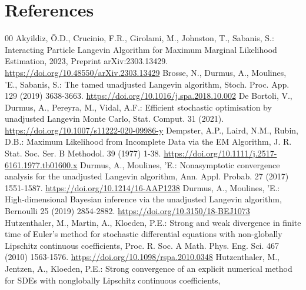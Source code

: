 \documentclass[a4paper, 10pt]{article}
\theoremstyle{plain}%
\begin{document}
\section{References} \vspace{-2.0em} \renewcommand\refname{} \begin{thebibliography}{00}
    Akyildiz, {\"O}.D.,  Crucinio, F.R., Girolami, M., Johnston, T., Sabanis, S.:
    Interacting Particle Langevin Algorithm for Maximum Marginal Likelihood Estimation,
    2023,
    Preprint arXiv:2303.13429.
    \url{https://doi.org/10.48550/arXiv.2303.13429}
    Brosse, N., Durmus, A., Moulines, {'E}., Sabanis, S.:
    The tamed unadjusted Langevin algorithm,
    Stoch. Proc. App.
    129 (2019) 3638-3663.
    \url{https://doi.org/10.1016/j.spa.2018.10.002}
    De Bortoli, V., Durmus, A., Pereyra, M., Vidal, A.F.:
    Efficient stochastic optimisation by unadjusted Langevin Monte Carlo,
    Stat. Comput.
    31 (2021).
    \url{https://doi.org/10.1007/s11222-020-09986-y}
    Dempster, A.P., Laird, N.M., Rubin, D.B.:
    Maximum Likelihood from Incomplete Data via the EM Algorithm,
    J. R. Stat. Soc. Ser. B Methodol.
    39 (1977) 1-38.
    \url{https://doi.org/10.1111/j.2517-6161.1977.tb01600.x}
    Durmus, A., Moulines, {'E}.:
    Nonasymptotic convergence analysis for the unadjusted Langevin algorithm,
    Ann. Appl. Probab.
    27 (2017) 1551-1587.
    \url{https://doi.org/10.1214/16-AAP1238}
    Durmus, A., Moulines, {'E}.:
    High-dimensional Bayesian inference via the unadjusted Langevin algorithm,
    Bernoulli
    25 (2019) 2854-2882.
    \url{https://doi.org/10.3150/18-BEJ1073}
    Hutzenthaler, M., Martin, A., Kloeden, P.E.:
    Strong and weak divergence in finite time of Euler’s method for stochastic differential equations with non-globally Lipschitz continuous coefficients,
    Proc. R. Soc. A Math. Phys. Eng. Sci.
    467 (2010) 1563-1576.
    \url{https://doi.org/10.1098/rspa.2010.0348}
    Hutzenthaler, M., Jentzen, A., Kloeden, P.E.:
    Strong convergence of an explicit numerical method for SDEs with nonglobally Lipschitz continuous coefficients,

\end{thebibliography}
\end{document}
